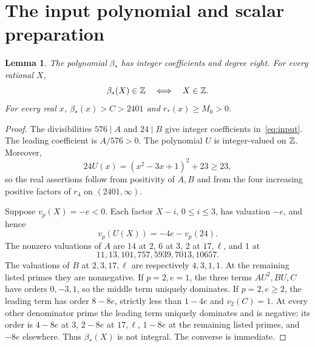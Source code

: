 \documentclass[11pt,a4paper]{article}
\newtheorem{lemma}[theorem]{Lemma}
\begin{document}
\section{The input polynomial and scalar preparation}
\begin{lemma}\label{lem:integrality}
The polynomial $\beta_*$ has integer coefficients and degree eight.
For every rational $X$,
\[
                 \beta_*(X)\in\mathbb Z\quad\Longleftrightarrow\quad X\in\mathbb Z.
\]
For every real $x$, $\beta_*(x)>C>2401$ and $r_*(x)\ge M_0>0$.
\end{lemma}
\begin{proof}
The divisibilities $576\mid A$ and $24\mid B$ give integer
coefficients in~\eqref{eq:input}. The leading coefficient is $A/576>0$.
The polynomial $U$ is integer-valued on $\mathbb Z$. Moreover,
\[
 24U(x)=(x^2-3x+1)^2+23\ge23,
\]
so the real assertions follow from positivity of $A,B$ and from the
four increasing positive factors of $r_4$ on $(2401,\infty)$.

Suppose $v_p(X)=-e<0$. Each factor $X-i$, $0\le i\le3$, has
valuation $-e$, and hence
\[
                        v_p(U(X))=-4e-v_p(24).
\]
The nonzero valuations of $A$ are $14$ at $2$, $6$ at $3$, $2$
at $17,\ell$, and $1$ at
\[
                 11,13,101,757,5939,7013,10657.
\]
The valuations of $B$ at $2,3,17,\ell$ are respectively $4,3,1,1$.
At the remaining listed primes they are nonnegative. If $p=2,e=1$,
the three terms $AU^2,BU,C$ have orders $0,-3,1$, so the middle
term uniquely dominates. If $p=2,e\ge2$, the leading term has
order $8-8e$, strictly less than $1-4e$ and $v_2(C)=1$.
At every other denominator prime the leading term uniquely dominates
and is negative: its order is $4-8e$ at $3$, $2-8e$ at $17,\ell$,
$1-8e$ at the remaining listed primes, and $-8e$ elsewhere.
Thus $\beta_*(X)$ is not integral. The converse is immediate.
\end{proof}
\end{document}
